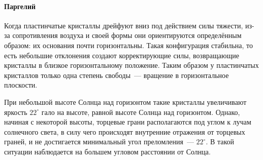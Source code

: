 \paragraph{Паргелий}

Когда пластинчатые кристаллы дрейфуют вниз под действием силы тяжести, из-за сопротивления воздуха и своей формы они ориентируются определённым образом: их основания почти горизонтальны. Такая конфигурация стабильна, то есть небольшие отклонения создают корректирующие силы, возвращающие кристаллы в близкое горизонтальному положение. Таким образом у пластинчатых кристаллов только одна степень свободы~--- вращение в горизонтальное плоскости.

При небольшой высоте Солнца над горизонтом такие кристаллы увеличивают яркость $22^\circ$ гало на высоте, равной высоте Солнца над горизонтом. Однако, начиная с некоторой высоты, торцевые грани располагаются под углом к лучам солнечного света, в силу чего происходят внутренние отражения от торцевых граней, и не достигается минимальный угол преломления~--- $22^\circ$. В такой ситуации  наблюдается на большем угловом расстоянии от Солнца.
